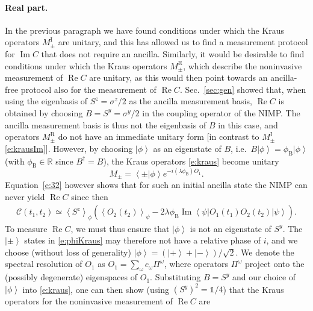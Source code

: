\documentclass[epjST,numbook]{svjour}
\newcommand\RR{{\mathds{R}}}
\newcommand{\wmcf}{\mathscr{C}}
\newcommand{\ket}[1]{\left \vert #1 \right >}
\newcommand{\matel}[3]{ \displaystyle \left\langle #1 \right \vert #2 \left\vert  #3 \right\rangle }
\newcommand{\expval}[1]{\left\langle #1 \right\rangle}
\newcommand{\innprod}[2]{ \displaystyle \left\langle #1 \vert #2 \right\rangle }
\DeclareMathOperator{\imp }{\mathrm{Im}}
\DeclareMathOperator{\rep}{\mathrm{Re}}
\begin{document}
\paragraph{Real part.}
In the previous paragraph we have found conditions under which the Kraus operators $M_\pm^\text{I}$ are unitary, and this has allowed us to find a measurement protocol for $\imp C$ that does not require an ancilla. Similarly, it would be desirable to find conditions under which the Kraus operators $M_\pm^\text{R}$, which describe the noninvasive measurement of $\rep C$ are unitary, as this would then point towards an ancilla-free protocol also for the measurement of $\rep C$. Sec.~\ref{sec:gen} showed that, when using the eigenbasis of $S^z=\sigma^z/2$ as the ancilla measurement basis, $\rep C$ is obtained by choosing $B=S^y=\sigma^y/2$ in the coupling operator of the NIMP. The ancilla measurement basis is thus not the eigenbasis of $B$ in this case, and operators $M_\pm^\text{R}$ do not have an immediate unitary form [in contrast to $M_\pm^\text{I}$ \eqref{e:krausIm}]. However, by choosing $\ket{\phi}$ as an eigenstate of $B$, i.e.\ $B\ket{\phi}=\phi_\text{B}\ket{\phi}$ (with $\phi_\text{B}\in\RR$ since $B^\dagger=B$), the Kraus operators \eqref{e:kraus} become unitary
\begin{equation}
		M_{\pm} = \innprod{\pm}{\phi}e^{-i(\lambda \phi_\text{B})O_1}.
\end{equation}
Equation~\eqref{e:32} however shows that for such an initial ancilla state the NIMP can never yield $\rep C$ since then
\begin{equation}
\begin{split}
\wmcf(t_1,t_2) \simeq \expval{S^z}_{\phi} \left( \expval{O_2(t_2)}_{\psi} - 2 \lambda \phi_\text{B} \imp \matel{\psi}{ O_1(t_1) O_2(t_2) }{\psi}\right).
\end{split}
\end{equation}%
To measure $\rep C$, we must thus ensure that $\ket{\phi}$ is not an eigenstate of $S^y$. The $\ket{\pm}$ states in \eqref{e:phiKraus} may therefore not have a relative phase of $i$, and we choose (without loss of generality) $\ket{\phi}=(\ket{+}+\ket{-})/\sqrt{2}$. We denote the spectral resolution of $O_1$ as $O_1=\sum_\omega e_\omega \Pi^\omega$, where operators $\Pi^\omega$ project onto the (possibly degenerate) eigenspaces of $O_1$. Substituting $B=S^y$ and our choice of $\ket{\phi}$ into \eqref{e:kraus}, one can then show (using $(S^y)^2=\mathds{1}/4$) that the Kraus operators for the noninvasive measurement of $\rep C$ are 
\end{document}
